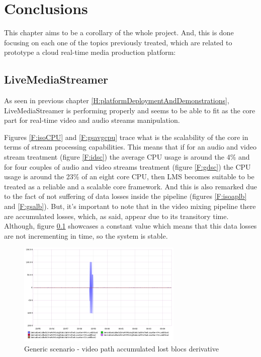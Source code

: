 \cleardoublepage
{}
\chapter*{Conclusions}\label{C:conclusions}

This chapter aims to be a corollary of the whole project. And, this is done focusing on each one of the topics previously treated, which are related to prototype a cloud real-time media production platform:

\section{LiveMediaStreamer}

As seen in previous chapter \ref{H:platformDeploymentAndDemonstrations}, LiveMediaStreamer is performing properly and seems to be able to fit as the core part for real-time video and audio streams manipulation.

Figures \ref{F:isoCPU} and \ref{F:gsavgcpu} trace what is the scalability of the core in terms of stream processing capabilities. This means that if for an audio and video stream treatment (figure \ref{F:idsc}) the average CPU usage is around the 4\% and for four couples of audio and video streams treatment (figure \ref{F:gdsc}) the CPU usage is around the 23\% of an eight core CPU, then LMS becomes suitable to be treated as a reliable and a scalable core framework. And this is also remarked due to the fact of not suffering of data losses inside the pipeline (figures \ref{F:isoaplb} and \ref{F:gsalb}). But, it's important to note that in the video mixing pipeline there are accumulated losses, which, as said, appear due to its transitory time. Although, figure \ref{F:gsvpalbd} showcases a constant value which means that this data losses are not incrementing in time, so the system is stable.

\begin{figure}[!htb]
\begin{center}
\includegraphics[width=0.70\textwidth]{./images/testAVMix/AVMixVideoLostBlocsDerivative.png}
\caption{Generic scenario - video path accumulated lost blocs derivative}
\label{F:gsvpalbd}
\end{center}
\end{figure}

